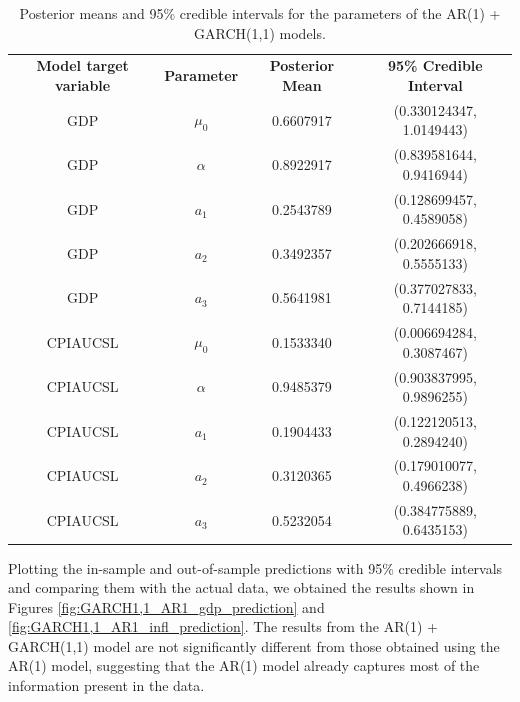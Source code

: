 \begin{table}[H]
    \centering
    \begin{tabular}{c|c|c|c}
        \textbf{Model target variable } & \textbf{Parameter } & \textbf{Posterior Mean } & \textbf{95\% Credible Interval } \\
        \cline{1-4}
        GDP      & $\mu_0$  & 0.6607917 & (0.330124347, 1.0149443) \\
        GDP      & $\alpha$ & 0.8922917 & (0.839581644, 0.9416944) \\
        GDP      & $a_1$    & 0.2543789 & (0.128699457, 0.4589058) \\
        GDP      & $a_2$    & 0.3492357 & (0.202666918, 0.5555133) \\
        GDP      & $a_3$    & 0.5641981 & (0.377027833, 0.7144185) \\
        CPIAUCSL & $\mu_0$  & 0.1533340 & (0.006694284, 0.3087467) \\
        CPIAUCSL & $\alpha$ & 0.9485379 & (0.903837995, 0.9896255) \\
        CPIAUCSL & $a_1$    & 0.1904433 & (0.122120513, 0.2894240) \\
        CPIAUCSL & $a_2$    & 0.3120365 & (0.179010077, 0.4966238) \\
        CPIAUCSL & $a_3$    & 0.5232054 & (0.384775889, 0.6435153) \\
    \end{tabular}
    \caption{Posterior means and 95\% credible intervals for the parameters of the AR(1) + GARCH(1,1) models.}
    \label{tab:GARCH1,1_AR1_posteriors}
\end{table}
Plotting the in-sample and out-of-sample predictions with 95\% credible intervals and comparing them with the actual data, we obtained the results shown in Figures \ref{fig:GARCH1,1_AR1_gdp_prediction} and \ref{fig:GARCH1,1_AR1_infl_prediction}. The results from the AR(1) + GARCH(1,1) model are not significantly different from those obtained using the AR(1) model, suggesting that the AR(1) model already captures most of the information present in the data. \\

